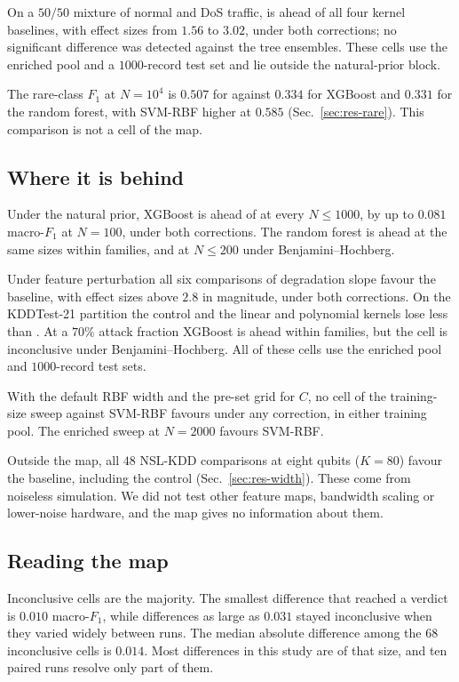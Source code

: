 On a $50/50$ mixture of normal and DoS traffic, \QSVM{} is ahead of all four kernel baselines,
with effect sizes from $1.56$ to $3.02$, under both corrections; no significant difference was
detected against the tree ensembles. These cells use the enriched pool and a $1000$-record test
set and lie outside the natural-prior block.

The rare-class $F_1$ at $N=10^4$ is $0.507$ for \QSVM{} against $0.334$ for XGBoost and $0.331$
for the random forest, with SVM-RBF higher at $0.585$ (Sec.~\ref{sec:res-rare}). This comparison
is not a cell of the map.

\subsection{Where it is behind}

Under the natural prior, XGBoost is ahead of \QSVM{} at every $N\leq1000$, by up to $0.081$
macro-$F_1$ at $N=100$, under both corrections. The random forest is ahead at the same sizes
within families, and at $N\leq200$ under Benjamini--Hochberg.

Under feature perturbation all six comparisons of degradation slope favour the baseline, with
effect sizes above $2.8$ in magnitude, under both corrections. On the KDDTest-21 partition the
\Zmap{} control and the linear and polynomial kernels lose less than \QSVM{}. At a $70\%$ attack
fraction XGBoost is ahead within families, but the cell is inconclusive under
Benjamini--Hochberg. All of these cells use the enriched pool and $1000$-record test sets.

With the default RBF width and the pre-set grid for $C$, no cell of the training-size sweep
against SVM-RBF favours \QSVM{} under any correction, in either training pool. The enriched sweep at $N=2000$ favours SVM-RBF.

Outside the map, all $48$ NSL-KDD comparisons at eight qubits ($K=80$) favour the baseline, including the \Zmap{} control
(Sec.~\ref{sec:res-width}). These come from noiseless simulation. We did not test other feature
maps, bandwidth scaling or lower-noise hardware, and the map gives no information about them.

\subsection{Reading the map}

Inconclusive cells are the majority. The smallest difference that reached a verdict is $0.010$
macro-$F_1$, while differences as large as $0.031$ stayed inconclusive when they varied widely
between runs. The median absolute difference among the $68$ inconclusive cells is $0.014$. Most
differences in this study are of that size, and ten paired runs resolve only part of them.


